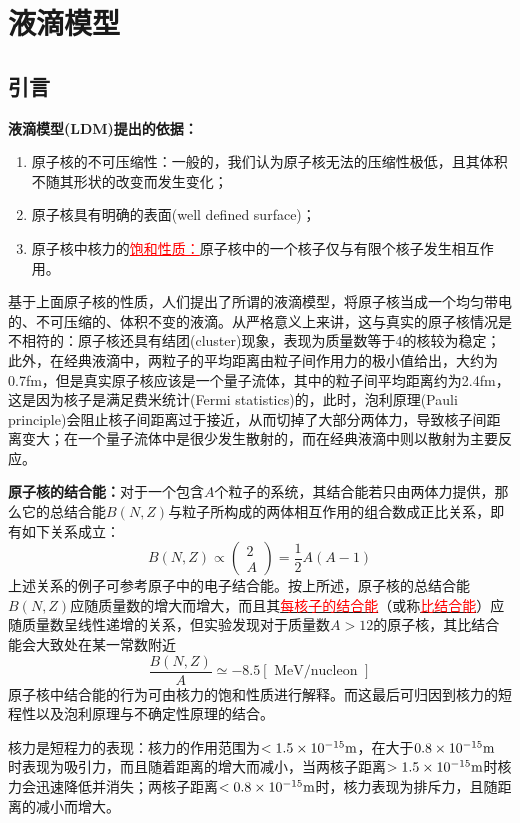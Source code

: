 \chapter{液滴模型}
\section{引言}
\textbf{液滴模型(LDM)提出的依据：}
\begin{enumerate}
	\item 原子核的不可压缩性：一般的，我们认为原子核无法的压缩性极低，且其体积不随其形状的改变而发生变化；
	\item 原子核具有明确的表面(well defined surface)；
	\item 原子核中核力的\textcolor{red}{\underline{饱和性质：}}原子核中的一个核子仅与有限个核子发生相互作用。
\end{enumerate}

基于上面原子核的性质，人们提出了所谓的液滴模型，将原子核当成一个均匀带电的、不可压缩的、体积不变的液滴。从严格意义上来讲，这与真实的原子核情况是不相符的：原子核还具有结团(cluster)现象，表现为质量数等于4的核较为稳定；此外，在经典液滴中，两粒子的平均距离由粒子间作用力的极小值给出，大约为0.7fm，但是真实原子核应该是一个量子流体，其中的粒子间平均距离约为2.4fm，这是因为核子是满足费米统计(Fermi statistics)的，此时，泡利原理(Pauli principle)会阻止核子间距离过于接近，从而切掉了大部分两体力，导致核子间距离变大；在一个量子流体中是很少发生散射的，而在经典液滴中则以散射为主要反应。

\textbf{原子核的结合能：}对于一个包含$A$个粒子的系统，其结合能若只由两体力提供，那么它的总结合能$B(N,Z)$与粒子所构成的两体相互作用的组合数成正比关系，即有如下关系成立：
\begin{equation*}
	B(N, Z) \propto
	\begin{pmatrix}
		2	\\
		A
	\end{pmatrix}
	= \frac{1}{2} A(A-1)
\end{equation*} 
上述关系的例子可参考原子中的电子结合能。按上所述，原子核的总结合能$B(N,Z)$应随质量数的增大而增大，而且其\underline{\textcolor{red}{每核子的结合能}}（或称\underline{\textcolor{red}{比结合能}}）应随质量数呈线性递增的关系，但实验发现对于质量数$A > 12$的原子核，其比结合能会大致处在某一常数附近
\begin{equation}
	\frac{B(N, Z)}{A} \simeq -8.5 [\text{ MeV/nucleon }]  \label{eq_specific_binding_energy}
\end{equation} 
原子核中结合能的行为可由核力的饱和性质进行解释。而这最后可归因到核力的短程性以及泡利原理与不确定性原理的结合。
\begin{note}
	核力是短程力的表现：核力的作用范围为$< 1.5 \times 10^{-15} {\rm m}$，在大于$0.8 \times 10^{-15} {\rm m}$ 时表现为吸引力，而且随着距离的增大而减小，当两核子距离$> 1.5 \times 10^{-15} {\rm m}$时核力会迅速降低并消失；两核子距离$ < 0.8 \times 10^{-15} {\rm m}$时，核力表现为排斥力，且随距离的减小而增大。
\end{note}

